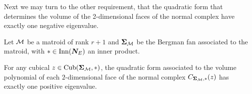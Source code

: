 \documentclass[12pt,oneside]{../../sfsuthesis}
\begin{document}
Next we may turn to the other requirement, that the quadratic form that determines the volume of the 2-dimensional faces of the normal complex have exactly one negative eigenvalue.

\begin{lemma}\th\label{thm:matroidOnePosEigen}

    Let \( \mathcal{M} \) be a matroid of rank \( r + 1 \) and \( \bm{\Sigma}_{\mathcal{M}} \) be the Bergman fan associated to the matroid, with \( \ast \in \mathrm{Inn}(\bm{N}_E) \) an inner product.

    For any cubical \( z \in \operatorname{Cub}(\bm{\Sigma}_{\mathcal{M}}, \ast) \), the quadratic form associated to the volume polynomial of each \( 2 \)-dimensional face of the normal complex \( C_{\bm{\Sigma}_{\mathcal{M}},\ast}(z) \)  has exactly one positive eigenvalue.

\end{lemma}
\end{document}
